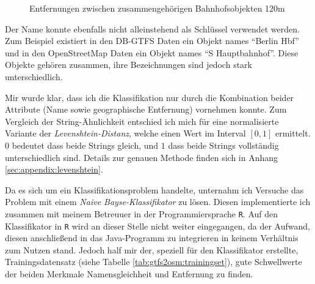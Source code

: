  \begin{figure}[htb]
   \centering
   \caption{Entfernungen zwischen zusammengehörigen Bahnhofsobjekten 120m}
   \label{fig:gtfs2osm:farLikelihood}
 \end{figure}

Der Name konnte ebenfalls nicht alleinstehend als Schlüssel verwendet werden. Zum Beispiel existiert in den DB-GTFS Daten ein Objekt names ``Berlin Hbf'' und in den OpenStreetMap Daten ein Objekt names ``S Hauptbahnhof''. Diese Objekte gehören zusammen, ihre Bezeichnungen sind jedoch stark unterschiedlich.

Mir wurde klar, dass ich die Klassifikation nur durch die Kombination beider Attribute (Name sowie geographische Entfernung) vornehmen konnte. Zum Vergleich der String-Ähnlichkeit entschied ich mich für eine normalisierte Variante der \textit{Levenshtein-Distanz}, welche einen Wert im Interval $[0,1]$ ermittelt.
$0$ bedeutet dass beide Strings gleich, und $1$ dass beide Strings vollständig unterschiedlich sind.
Details zur genauen Methode finden sich in Anhang \ref{sec:appendix:levenshtein}.

Da es sich um ein Klassifikationsproblem handelte, unternahm ich Versuche das Problem mit einem \textit{Naive Bayse-Klassifikator} zu lösen.
Diesen implementierte ich zusammen mit meinem Betreuuer in der Programmiersprache \texttt{R}.
Auf den Klassifikator in \texttt{R} wird an dieser Stelle nicht weiter eingegangen, da der Aufwand, diesen anschließend in das Java-Programm zu integrieren in keinem Verhältnis zum Nutzen stand.
Jedoch half mir der, speziell für den Klassifikator erstellte, Trainingsdatensatz (siehe Tabelle \ref{tab:gtfs2osm:trainingset}), gute Schwellwerte der beiden Merkmale Namensgleichheit und Entfernung zu finden.

